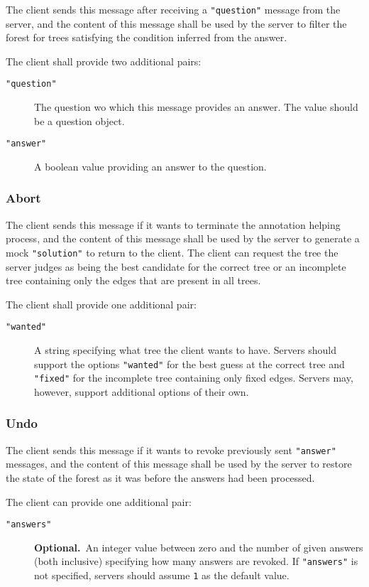 \documentclass{scrartcl}
\newcommand{\jsstring}[1]{\texttt{\color{OrangeRed}"#1"}}
\newcommand{\js}[1]{\lstinline[style=JSONInputStyle];#1;}
\newcommand{\optional}{\textbf{Optional.}}
\newcommand{\checkthis}[1]{#1}
\begin{document}
The client sends this message after receiving a \jsstring{question} message from the server,
and the content of this message shall be used by the server to filter the forest for trees satisfying
the condition inferred from the answer.

The client shall provide two additional pairs:
\begin{description}
    \item[\jsstring{question}] The question wo which this message provides an answer.
        The value should be a \checkthis{question object}.
    \item[\jsstring{answer}] A boolean value providing an answer to the question.
\end{description}

\subsubsection{Abort}
\label{ssub:Abort}

The client sends this message if it wants to terminate the annotation helping process,
and the content of this message shall be used by the server to generate a mock \jsstring{solution} to return to the client.
The client can request the tree the server judges as being the best candidate for the correct tree or an incomplete tree containing only the edges that are present in all trees.

The client shall provide one additional pair:
\begin{description}
    \item[\jsstring{wanted}] A string specifying what tree the client wants to have.
        Servers should support the options \jsstring{wanted} for the best guess at the correct tree and \jsstring{fixed} for the incomplete tree containing only fixed edges.
        Servers may, however, support additional options of their own.
\end{description}

\subsubsection{Undo}
\label{ssub:Undo}

The client sends this message if it wants to revoke previously sent \jsstring{answer} messages,
and the content of this message shall be used by the server to restore the state of the forest as it was before the answers had been processed.

The client can provide one additional pair:
\begin{description}
    \item[\jsstring{answers}] \optional\ An integer value between zero and the number of given answers (both inclusive) specifying how many answers are revoked.
        If \jsstring{answers} is not specified, servers should assume \js{1} as the default value.
\end{description}
\end{document}
